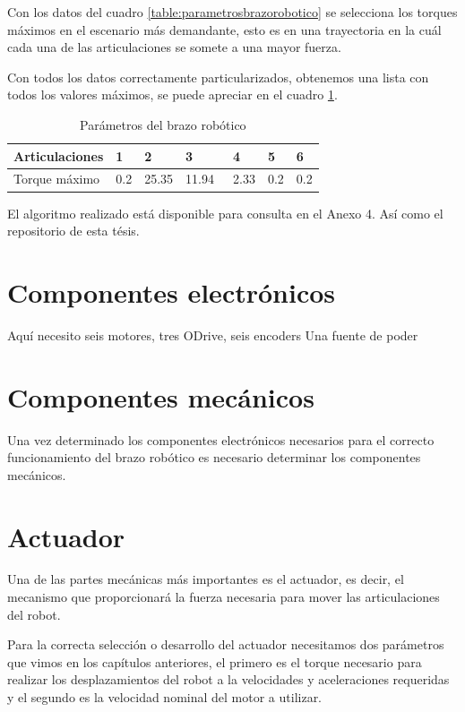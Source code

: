 Con los datos del cuadro \ref{table:parametrosbrazorobotico} se selecciona los torques máximos en el escenario más demandante, esto es en una trayectoria en la cuál cada una de las articulaciones se somete a una mayor fuerza.

Con todos los datos correctamente particularizados, obtenemos una lista con todos los valores máximos, se puede apreciar en el cuadro \ref{table:maxtorque}. 

\begin{table}
\centering
\caption{Parámetros del brazo robótico}
\label{table:maxtorque}
\begin{tabular}{l|l|l|l|l|l|l|}
\textbf{Articulaciones}              &  1 & 2 & 3 &  4 &  5 &  6  \\ 
\hline
Torque máximo & 0.2            & 25.35          & 11.94~         & 2.33           & 0.2            & 0.2            
\end{tabular}
\end{table}

El algoritmo realizado está disponible para consulta en el Anexo 4. Así como el repositorio de esta tésis.
       
\section{Componentes electrónicos}

Aquí necesito seis motores, tres ODrive, seis encoders
Una fuente de poder 

\section{Componentes mecánicos}

Una vez determinado los componentes electrónicos necesarios para el correcto funcionamiento del brazo robótico es necesario determinar los componentes mecánicos.

\section{Actuador}

Una de las partes mecánicas más importantes es el actuador, es decir, el mecanismo que proporcionará la fuerza necesaria para mover las articulaciones del robot.

Para la correcta selección o desarrollo del actuador necesitamos dos parámetros que vimos en los capítulos anteriores, el primero es el torque necesario para realizar los desplazamientos del robot a la velocidades y aceleraciones requeridas y el segundo es la velocidad nominal del motor a utilizar.

